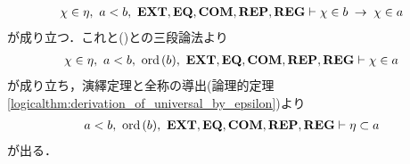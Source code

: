 \begin{prf}
\begin{description}
				\begin{align}
					\chi \in \eta,\ a < b,\ \EXTAX,\EQAX,\COMAX,\REPAX,\REGAX \vdash \chi \in b \rarrow \chi \in a
				\end{align}
				が成り立つ．これと()との三段論法より
				\begin{align}
					\chi \in \eta,\ a < b,\ \ord{b},\ \EXTAX,\EQAX,\COMAX,\REPAX,\REGAX \vdash \chi \in a
				\end{align}
				が成り立ち，演繹定理と全称の導出(論理的定理\ref{logicalthm:derivation_of_universal_by_epsilon})より
				\begin{align}
					a < b,\ \ord{b},\ \EXTAX,\EQAX,\COMAX,\REPAX,\REGAX \vdash \eta \subset a
					\label{fom:element_and_proper_subset_correspond_19}
				\end{align}
				が出る．
			

\end{description}
\end{prf}
